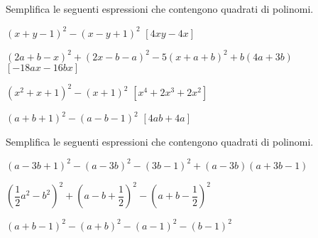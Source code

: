 \begin{esercizio}
\begin{enumeratea}
\end{enumeratea}
\end{esercizio}

\begin{esercizio}[\Ast]
 \label{ese:11.14}
Semplifica le seguenti espressioni che contengono quadrati di polinomi.

\begin{enumeratea}
 \item $(x+y-1)^{2}-(x-y+1)^{2}$
  \hfill $\left[4{xy}-4x\right]$
\item $(2a+b-x)^{2}+(2x-b-a)^{2}-5(x+a+b)^{2}+b(4a+3b)$
  \hfill $\left[-18ax-16bx\right]$
\item $\left(x^{2}+x+1\right)^{2}-(x+1)^{2}$
  \hfill $\left[x^{4}+2x^{3}+2x^{2}\right]$
\item $(a+b+1)^{2}-(a-b-1)^{2}$
  \hfill $\left[4ab+4a\right]$
\end{enumeratea}
\end{esercizio}

\begin{esercizio}
 \label{ese:11.15}
Semplifica le seguenti espressioni che contengono quadrati di polinomi.

\begin{enumeratea}
 \item $(a-3b+1)^{2}-(a-3b)^{2}-(3b-1)^{2}+(a-3b)(a+3b-1)$
\item 
$\left(\dfrac{1}{2}a^{2}-b^{2}\right)^{2}+\left(a-b+\dfrac{1}{2}\right)^{2}
-\left(a+b-\dfrac{1}{2}\right)^{2}$
\item $(a+b-1)^{2}-(a+b)^{2}-(a-1)^{2}-(b-1)^{2}$
\end{enumeratea}
\end{esercizio}

